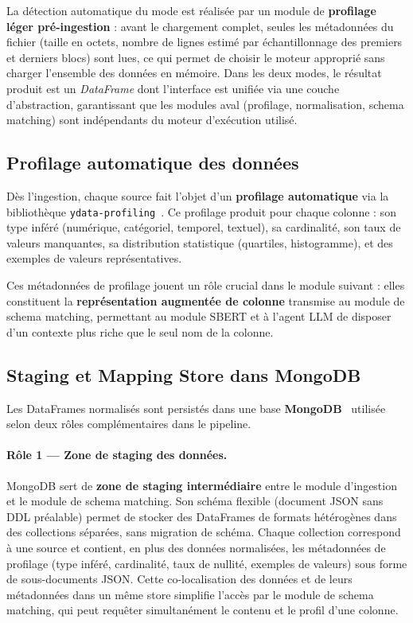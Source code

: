 La détection automatique du mode est réalisée par un module de
\textbf{profilage léger pré-ingestion} : avant le chargement
complet, seules les métadonnées du fichier (taille en octets,
nombre de lignes estimé par échantillonnage des premiers et derniers
blocs) sont lues, ce qui permet de choisir le moteur approprié
sans charger l'ensemble des données en mémoire.
Dans les deux modes, le résultat produit est un
\textit{DataFrame} dont l'interface est unifiée via une couche
d'abstraction, garantissant que les modules aval (profilage,
normalisation, schema matching) sont indépendants du moteur
d'exécution utilisé.

\subsection{Profilage automatique des données}

Dès l'ingestion, chaque source fait l'objet d'un \textbf{profilage automatique}
via la bibliothèque \texttt{ydata-profiling}~\cite{ydataprofiling2023}.
Ce profilage produit pour chaque colonne : son type inféré (numérique, catégoriel,
temporel, textuel), sa cardinalité, son taux de valeurs manquantes, sa
distribution statistique (quartiles, histogramme), et des exemples de valeurs
représentatives.

Ces métadonnées de profilage jouent un rôle crucial dans le module suivant :
elles constituent la \textbf{représentation augmentée de colonne} transmise
au module de schema matching, permettant au module SBERT et à l'agent LLM de
disposer d'un contexte plus riche que le seul nom de la colonne.

\subsection{Staging et Mapping Store dans MongoDB}
\label{subsec:mongodb}

Les DataFrames normalisés sont persistés dans une base
\textbf{MongoDB}~\cite{mongodb2024} utilisée selon deux rôles
complémentaires dans le pipeline.

\paragraph{Rôle 1 — Zone de staging des données.}
MongoDB sert de \textbf{zone de staging intermédiaire} entre le
module d'ingestion et le module de schema matching.
Son schéma flexible (document JSON sans DDL préalable) permet de
stocker des DataFrames de formats hétérogènes dans des collections
séparées, sans migration de schéma.
Chaque collection correspond à une source et contient, en plus
des données normalisées, les métadonnées de profilage
(type inféré, cardinalité, taux de nullité, exemples de valeurs)
sous forme de sous-documents JSON.
Cette co-localisation des données et de leurs métadonnées dans un
même store simplifie l'accès par le module de schema matching,
qui peut requêter simultanément le contenu et le profil d'une
colonne.

